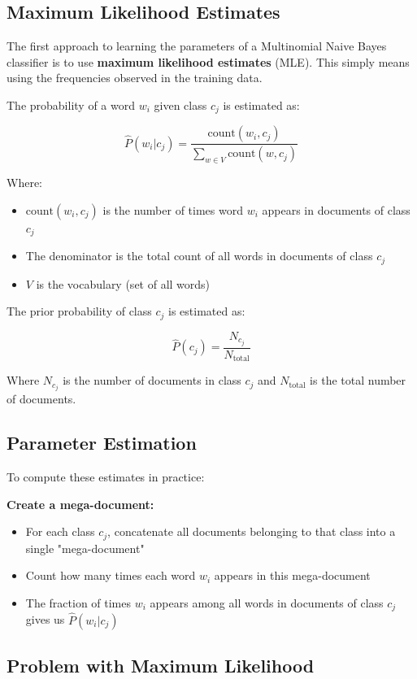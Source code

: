 \documentclass[11pt,a4paper]{article}
\theoremstyle{definition}
\theoremstyle{plain}
\theoremstyle{remark}
\begin{document}
\subsection{Maximum Likelihood Estimates}

The first approach to learning the parameters of a Multinomial Naive Bayes classifier is to use \textbf{maximum likelihood estimates} (MLE). This simply means using the frequencies observed in the training data.

The probability of a word $w_i$ given class $c_j$ is estimated as:

\[
\hat{P}(w_i | c_j) = \frac{\text{count}(w_i, c_j)}{\sum_{w \in V} \text{count}(w, c_j)}
\]

Where:
\begin{itemize}
    \item $\text{count}(w_i, c_j)$ is the number of times word $w_i$ appears in documents of class $c_j$
    \item The denominator is the total count of all words in documents of class $c_j$
    \item $V$ is the vocabulary (set of all words)
\end{itemize}

The prior probability of class $c_j$ is estimated as:

\[
\hat{P}(c_j) = \frac{N_{c_j}}{N_{\text{total}}}
\]

Where $N_{c_j}$ is the number of documents in class $c_j$ and $N_{\text{total}}$ is the total number of documents.

\subsection{Parameter Estimation}

To compute these estimates in practice:

\textbf{Create a mega-document:}
\begin{itemize}
    \item For each class $c_j$, concatenate all documents belonging to that class into a single "mega-document"
    \item Count how many times each word $w_i$ appears in this mega-document
    \item The fraction of times $w_i$ appears among all words in documents of class $c_j$ gives us $\hat{P}(w_i | c_j)$
\end{itemize}

\subsection{Problem with Maximum Likelihood}
\end{document}
